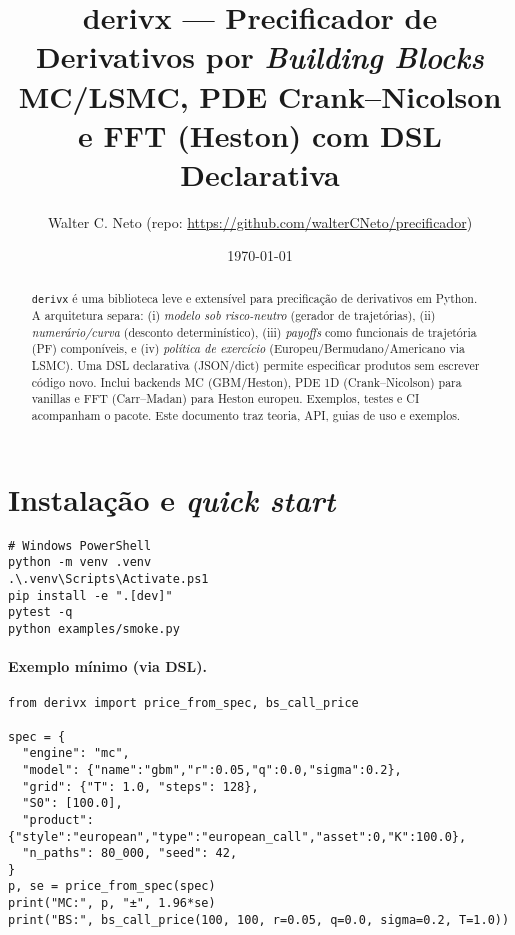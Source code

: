 \documentclass[11pt,a4paper]{article}
\title{\textbf{derivx} --- Precificador de Derivativos por \emph{Building Blocks}\\
\large MC/LSMC, PDE Crank--Nicolson e FFT (Heston) com DSL Declarativa}
\author{Walter C. Neto (repo: \url{https://github.com/walterCNeto/precificador})}
\date{\today}
\begin{document}
\maketitle

\begin{abstract}
\texttt{derivx} é uma biblioteca leve e extensível para precificação de derivativos em Python.
A arquitetura separa: (i) \emph{modelo sob risco-neutro} (gerador de trajetórias),
(ii) \emph{numerário/curva} (desconto determinístico), (iii) \emph{payoffs} como funcionais de trajetória (PF) componíveis,
e (iv) \emph{política de exercício} (Europeu/Bermudano/Americano via LSMC).
Uma DSL declarativa (JSON/dict) permite especificar produtos sem escrever código novo.
Inclui backends MC (GBM/Heston), PDE 1D (Crank--Nicolson) para vanillas e FFT (Carr--Madan) para Heston europeu.
Exemplos, testes e CI acompanham o pacote. Este documento traz teoria, API, guias de uso e exemplos.
\end{abstract}

\tableofcontents

\section{Instalação e \emph{quick start}}
\begin{verbatim}
# Windows PowerShell
python -m venv .venv
.\.venv\Scripts\Activate.ps1
pip install -e ".[dev]"
pytest -q
python examples/smoke.py
\end{verbatim}

\paragraph{Exemplo mínimo (via DSL).}
\begin{lstlisting}[style=pystyle]
from derivx import price_from_spec, bs_call_price

spec = {
  "engine": "mc",
  "model": {"name":"gbm","r":0.05,"q":0.0,"sigma":0.2},
  "grid": {"T": 1.0, "steps": 128},
  "S0": [100.0],
  "product": {"style":"european","type":"european_call","asset":0,"K":100.0},
  "n_paths": 80_000, "seed": 42,
}
p, se = price_from_spec(spec)
print("MC:", p, "±", 1.96*se)
print("BS:", bs_call_price(100, 100, r=0.05, q=0.0, sigma=0.2, T=1.0))
\end{lstlisting}
\end{document}
